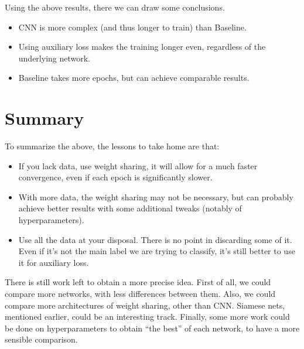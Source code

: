 \documentclass[10pt,conference]{IEEEtran}
\begin{document}
Using the above results, there we can draw some conclusions.
\begin{itemize}
    \item CNN is more complex (and thus longer to train) than Baseline.
    \item Using auxiliary loss makes the training longer even, regardless of the underlying network.
    \item Baseline takes more epochs, but can achieve comparable results.
\end{itemize}
\section{Summary}
To summarize the above, the lessons to take home are that:
\begin{itemize}
    \item If you lack data, use weight sharing, it will allow for a much faster convergence, even if each epoch is significantly slower.
    \item With more data, the weight sharing may not be necessary, but can probably achieve better results with some additional tweaks (notably of hyperparameters).
    \item Use all the data at your disposal. There is no point in discarding some of it. Even if it's not the main label we are trying to classify, it's still better to use it for auxiliary loss.
\end{itemize}
There is still work left to obtain a more precise idea. First of all, we could compare more networks, with less differences between them. Also, we could compare more architectures of weight sharing, other than CNN. Siamese nets, mentioned earlier, could be an interesting track. Finally, some more work could be done on hyperparameters to obtain ``the best'' of each network, to have a more sensible comparison.


\end{document}
